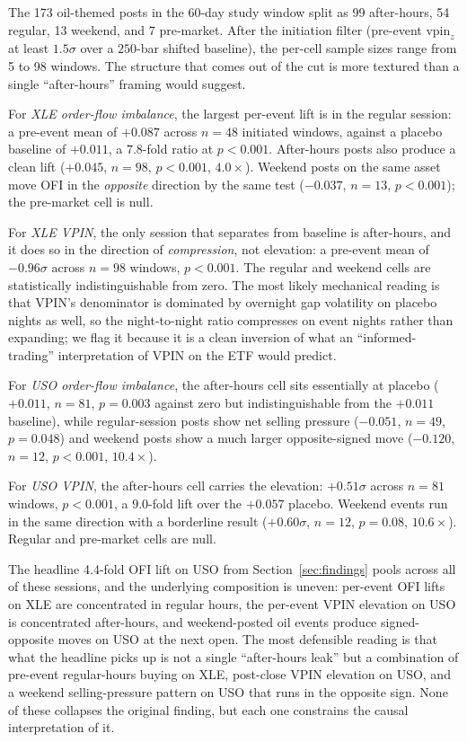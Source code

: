 \documentclass[11pt,a4paper]{article}
\newcommand{\vpinz}{\mathrm{vpin}_{z}}
\begin{document}
The 173 oil-themed posts in the 60-day study window split as 99 after-hours, 54 regular, 13 weekend, and 7 pre-market. After the initiation filter (pre-event $\vpinz$ at least $1.5\sigma$ over a $250$-bar shifted baseline), the per-cell sample sizes range from 5 to 98 windows. The structure that comes out of the cut is more textured than a single ``after-hours'' framing would suggest.

For \emph{XLE order-flow imbalance}, the largest per-event lift is in the regular session: a pre-event mean of $+0.087$ across $n = 48$ initiated windows, against a placebo baseline of $+0.011$, a $7.8$-fold ratio at $p < 0.001$. After-hours posts also produce a clean lift ($+0.045$, $n = 98$, $p < 0.001$, $4.0\times$). Weekend posts on the same asset move OFI in the \emph{opposite} direction by the same test ($-0.037$, $n = 13$, $p < 0.001$); the pre-market cell is null.

For \emph{XLE VPIN}, the only session that separates from baseline is after-hours, and it does so in the direction of \emph{compression}, not elevation: a pre-event mean of $-0.96\sigma$ across $n = 98$ windows, $p < 0.001$. The regular and weekend cells are statistically indistinguishable from zero. The most likely mechanical reading is that VPIN's denominator is dominated by overnight gap volatility on placebo nights as well, so the night-to-night ratio compresses on event nights rather than expanding; we flag it because it is a clean inversion of what an ``informed-trading'' interpretation of VPIN on the ETF would predict.

For \emph{USO order-flow imbalance}, the after-hours cell sits essentially at placebo ($+0.011$, $n = 81$, $p = 0.003$ against zero but indistinguishable from the $+0.011$ baseline), while regular-session posts show net selling pressure ($-0.051$, $n = 49$, $p = 0.048$) and weekend posts show a much larger opposite-signed move ($-0.120$, $n = 12$, $p < 0.001$, $10.4\times$).

For \emph{USO VPIN}, the after-hours cell carries the elevation: $+0.51\sigma$ across $n = 81$ windows, $p < 0.001$, a $9.0$-fold lift over the $+0.057$ placebo. Weekend events run in the same direction with a borderline result ($+0.60\sigma$, $n = 12$, $p = 0.08$, $10.6\times$). Regular and pre-market cells are null.

The headline 4.4-fold OFI lift on USO from Section~\ref{sec:findings} pools across all of these sessions, and the underlying composition is uneven: per-event OFI lifts on XLE are concentrated in regular hours, the per-event VPIN elevation on USO is concentrated after-hours, and weekend-posted oil events produce signed-opposite moves on USO at the next open. The most defensible reading is that what the headline picks up is not a single ``after-hours leak'' but a combination of pre-event regular-hours buying on XLE, post-close VPIN elevation on USO, and a weekend selling-pressure pattern on USO that runs in the opposite sign. None of these collapses the original finding, but each one constrains the causal interpretation of it.
\end{document}
